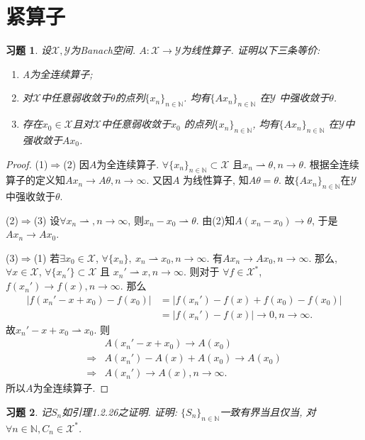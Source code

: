 \documentclass[UTF8,twoside]{ctexbook}
\newtheorem{exercise}{习题}[section]
\newcommand{\h}{\mathscr}
\newcommand{\kx}{\mathbb}
\numberwithin{equation}{section}
\begin{document}
	\section{紧算子}
	\begin{exercise}
		设$\h X,\h Y$为Banach空间. $A:\h X\rightarrow\h Y$为线性算子. 证明以下三条等价:
		\begin{enumerate}[(1)]
			\item A为全连续算子;
			\item 对$\h X$中任意弱收敛于$\theta$的点列$\{x_n\}_{n\in\kx N}$. 均有$\{Ax_n\}_{n\in\kx N}$ 在$\h Y$ 中强收敛于$\theta$.
			\item 存在$x_0\in\h X$且对$\h X$中任意弱收敛于$x_0$ 的点列$\{x_n\}_{n\in\kx N}$, 均有$\{Ax_n\}_{n\in\kx N}$ 在$\h Y$中强收敛于$Ax_0$.
		\end{enumerate}
	\end{exercise}
	\begin{proof}
		(1)$\Rightarrow$(2) 因$A$为全连续算子. $\forall\{x_n\}_{n\in\kx N}\subset\h X$ 且$x_n\rightharpoonup\theta,n\rightarrow\theta$. 根据全连续算子的定义知$Ax_n\rightarrow A\theta, n\rightarrow\infty$. 又因$A$ 为线性算子, 知$A\theta=\theta$. 故$\{Ax_n\}_{n\in\kx N}$在$\h Y$中强收敛于$\theta$.

		(2)$\Rightarrow$(3) 设$\forall x_n\rightharpoonup,n\rightarrow\infty$, 则$x_n-x_0\rightharpoonup\theta$. 由(2)知$A(x_n-x_0)\rightarrow\theta$, 于是$Ax_n\rightarrow Ax_0$.

		(3)$\Rightarrow$(1) 若$\exists x_0\in\h X$, $\forall\{x_n\},\ x_n\rightharpoonup x_0,n\rightarrow\infty$. 有$Ax_n\rightarrow Ax_0,n\rightarrow\infty$. 那么, $\forall x\in\h X$, $\forall \{x_n'\}\subset\h X$ 且 $x_n'\rightharpoonup x,n\rightarrow\infty$. 则对于 $\forall f\in\h X^*$, $f(x_n')\rightarrow f(x),n\rightarrow\infty$. 那么
		\[
		\begin{aligned}
		|f(x_n'-x+x_0)-f(x_0)|&=|f(x_n')-f(x)+f(x_0)-f(x_0)|\\
		&=|f(x_n')-f(x)|\rightarrow 0,n\rightarrow\infty.
		\end{aligned}
		\]
		故$x_n'-x+x_0\rightharpoonup x_0$. 则
		\[
		\begin{aligned}
		&A(x_n'-x+x_0)\rightarrow A(x_0) \\
		\Longrightarrow & A(x_n')-A(x)+A(x_0)\rightarrow A(x_0) \\
		\Longrightarrow & A(x_n')\rightarrow A(x),n\rightarrow\infty.
		\end{aligned}
		\]
		所以$A$为全连续算子.
	\end{proof}
	\begin{exercise}
		记$S_n$如引理1.2.26之证明. 证明: $\{S_n\}_{n\in\kx N}$一致有界当且仅当, 对$\forall n\in\kx N, C_n\in\h X^*$.
	\end{exercise}
\end{document}
